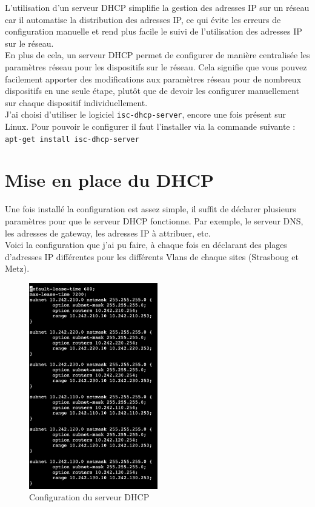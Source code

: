 \documentclass[12pt, a4paper]{article}
\begin{document}
    L'utilisation d'un serveur DHCP simplifie la gestion des adresses IP 
    sur un réseau car il automatise la distribution des adresses IP, ce 
    qui évite les erreurs de configuration manuelle et rend plus facile 
    le suivi de l'utilisation des adresses IP sur le réseau.\\

    En plus de cela, un serveur DHCP permet de configurer de manière 
    centralisée les paramètres réseau pour les dispositifs sur le réseau. 
    Cela signifie que vous pouvez facilement apporter des modifications aux 
    paramètres réseau pour de nombreux dispositifs en une seule étape, plutôt 
    que de devoir les configurer manuellement sur chaque dispositif 
    individuellement.\\
    
    J'ai choisi d'utiliser le logiciel \texttt{isc-dhcp-server}, encore une fois présent sur Linux.
    Pour pouvoir le configurer il faut l'installer via la commande suivante : 
    \texttt{apt-get install isc-dhcp-server}

    \section{Mise en place du DHCP}
    Une fois installé la configuration est assez simple, il suffit de déclarer 
    plusieurs paramètres pour que le serveur DHCP fonctionne. Par exemple, le 
    serveur DNS, les adresses de gateway, les adresses IP à attribuer, etc.\\

    \newpage
    Voici la configuration que j'ai pu faire, à chaque fois en déclarant
    des plages d'adresses IP différentes pour les différents Vlans de chaque sites
    (Strasboug et Metz).

    \begin{figure}[h]
		\centering
		\includegraphics[width=0.5\textwidth]{img/dhcp.png}
		\caption{Configuration du serveur DHCP}
		\label{fig:dhcp}
	\end{figure}
\end{document}
